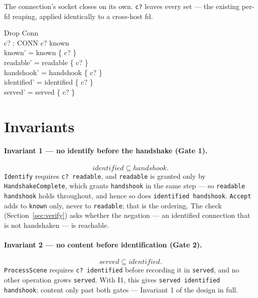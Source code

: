 \documentclass[a4paper,10pt,fleqn]{article}
\begin{document}
The connection's socket closes on its own.  \texttt{c?} leaves every set
--- the existing per-fd reaping, applied identically to a cross-host fd.

\begin{schema}{Drop}
  \Delta Conn \\
  c? : CONN
\where
  c? \in known \\
  known' = known \setminus \{ c? \} \\
  readable' = readable \setminus \{ c? \} \\
  handshook' = handshook \setminus \{ c? \} \\
  identified' = identified \setminus \{ c? \} \\
  served' = served \setminus \{ c? \}
\end{schema}

\section{Invariants}
\label{sec:inv}

\paragraph{Invariant 1 --- no identify before the handshake (Gate 1).}
\[
  identified \subseteq handshook.
\]
\texttt{Identify} requires \texttt{c? \in readable}, and \texttt{readable}
is granted only by \texttt{HandshakeComplete}, which grants
\texttt{handshook} in the same step --- so \texttt{readable \subseteq
handshook} holds throughout, and hence so does \texttt{identified
\subseteq handshook}.  \texttt{Accept} adds to \texttt{known} only, never
to \texttt{readable}; that is the ordering.  The check
(Section~\ref{sec:verify}) asks whether the negation --- an identified
connection that is not handshaken --- is reachable.

\paragraph{Invariant 2 --- no content before identification (Gate 2).}
\[
  served \subseteq identified.
\]
\texttt{ProcessScene} requires \texttt{c? \in identified} before recording
it in \texttt{served}, and no other operation grows \texttt{served}.  With
I1, this gives \texttt{served \subseteq identified \subseteq handshook}:
content only past both gates --- Invariant 1 of the design in full.
\end{document}
